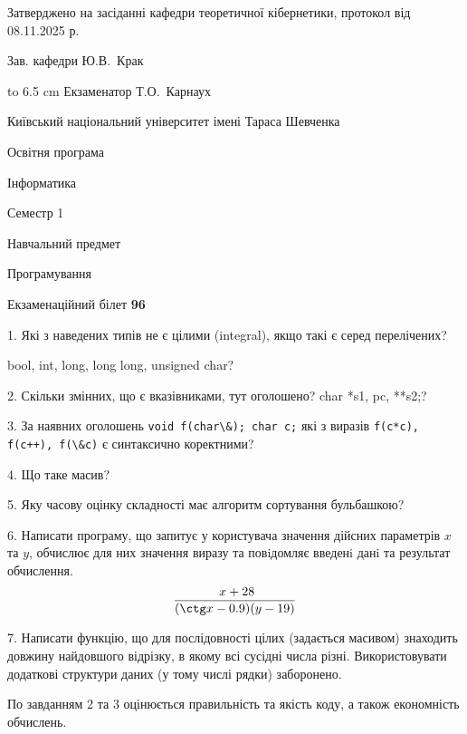 \documentclass[12pt, ukrainian]{article}
\def\code#1{\Verb!#1!}
\begin{document}
{\smallskip\smallskip \begin {scriptsize} Затверджено на засіданні кафедри теоретичної кібернетики, протокол   від   08.11.2025 р.\par\smallskip\smallskip\smallskip\smallskip
{\parbox {6.5 cm} {Зав. кафедри \dotfill Ю.В.~Крак}}\hspace {0.7cm} {\hbox to 6.5 cm { Екзаменатор \dotfill Т.О.~Карнаух}} \end{scriptsize}}
\vspace{0.9cm}
{{\begin {scriptsize}\par
{ \center  Київський національний університет імені Тараса Шевченка \par}
{\parbox {5 cm}{Освітня програма \hfill}{\parbox {7 cm}{Інформатика\hfill}}\parbox {6 cm}{\hfill Семестр 1}}\par
{\parbox {5 cm} {Навчальний предмет \hfill}\parbox {7 cm}{Програмування \hfill}\parbox {6cm}{\hfill}\par}\vspace{-15pt} \end{scriptsize}}{\center Екзаменаційний білет \No \textbf { 96 }\par}}
{%
1. Які з наведених типів не є цілими (integral), якщо такі є серед перелічених?

bool, int, long, long long, unsigned char?
\par
\vspace{2mm}
2. Скільки змінних, що є вказівниками, тут оголошено?
char *s1, pc, **s2;?
\par
\vspace{2mm}
3. За наявних оголошень \code{void f(char\&); char c;} які з виразів \code{f(c*c), f(c++), f(\&c)} є синтаксично коректними?
\par
\vspace{2mm}
4. Що таке масив?
\par
\vspace{2mm}
5. Яку часову оцінку складності має алгоритм сортування бульбашкою?
\par
\vspace{2mm}
6. Написати програму, що запитує у користувача значення дійсних параметрів $x$ та $y$, обчислює для них значення виразу та повiдомляє введенi данi та результат обчислення.
$$\frac{\ x + 28}{(\ctg x - 0.9) (y - 19)}$$ 

\par
7. Написати функцію, що для послідовності цілих (задається масивом) знаходить довжину найдовшого відрізку, в якому всі сусідні числа різні. Використовувати додаткові структури даних (у тому числі рядки) заборонено.

По завданням 2 та 3 оцінюється правильність та якість коду, а також економність обчислень.

}
\end{document}
